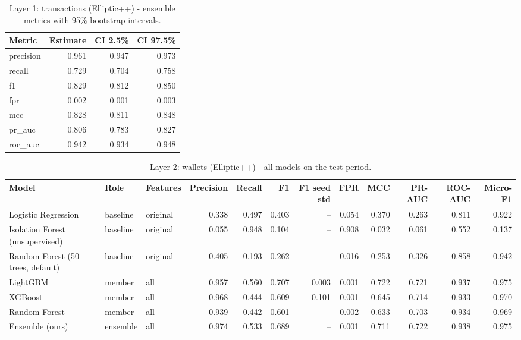\begin{table}[t]
\centering
\caption{Layer 1: transactions (Elliptic++) - ensemble metrics with 95\% bootstrap intervals.}
\label{tab:transaction-ci}
\begin{tabular}{lrrr}
\toprule
Metric & Estimate & CI 2.5\% & CI 97.5\% \\
\midrule
precision & 0.961 & 0.947 & 0.973 \\
recall & 0.729 & 0.704 & 0.758 \\
f1 & 0.829 & 0.812 & 0.850 \\
fpr & 0.002 & 0.001 & 0.003 \\
mcc & 0.828 & 0.811 & 0.848 \\
pr\_auc & 0.806 & 0.783 & 0.827 \\
roc\_auc & 0.942 & 0.934 & 0.948 \\
\bottomrule
\end{tabular}
\end{table}

\begin{table}[t]
\centering
\caption{Layer 2: wallets (Elliptic++) - all models on the test period.}
\label{tab:wallet-models}
\begin{tabular}{lllrrrrrrrrr}
\toprule
Model & Role & Features & Precision & Recall & F1 & F1 seed std & FPR & MCC & PR-AUC & ROC-AUC & Micro-F1 \\
\midrule
Logistic Regression & baseline & original & 0.338 & 0.497 & 0.403 & -- & 0.054 & 0.370 & 0.263 & 0.811 & 0.922 \\
Isolation Forest (unsupervised) & baseline & original & 0.055 & 0.948 & 0.104 & -- & 0.908 & 0.032 & 0.061 & 0.552 & 0.137 \\
Random Forest (50 trees, default) & baseline & original & 0.405 & 0.193 & 0.262 & -- & 0.016 & 0.253 & 0.326 & 0.858 & 0.942 \\
LightGBM & member & all & 0.957 & 0.560 & 0.707 & 0.003 & 0.001 & 0.722 & 0.721 & 0.937 & 0.975 \\
XGBoost & member & all & 0.968 & 0.444 & 0.609 & 0.101 & 0.001 & 0.645 & 0.714 & 0.933 & 0.970 \\
Random Forest & member & all & 0.939 & 0.442 & 0.601 & -- & 0.002 & 0.633 & 0.703 & 0.934 & 0.969 \\
Ensemble (ours) & ensemble & all & 0.974 & 0.533 & 0.689 & -- & 0.001 & 0.711 & 0.722 & 0.938 & 0.975 \\
\bottomrule
\end{tabular}
\end{table}

